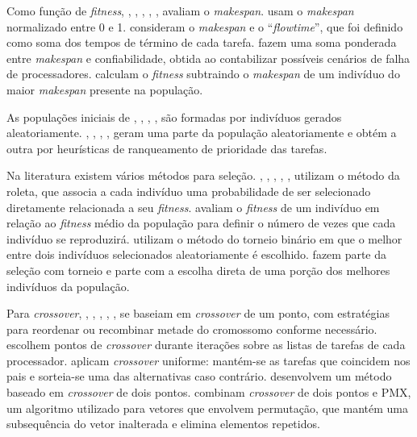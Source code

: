 \documentclass[fleqn,10pt]{SelfArx} %
\begin{document}
Como função de \textit{fitness}, \citeauthor{Hou1994}, \citeauthor{WANG19978}, \citeauthor{Correa}, \citeauthor{HWANG2008976}, \citeauthor{OMARA201013}, \citeauthor{Morady} avaliam o \textit{makespan}. \citeauthor{Kwok:1997:ESA:274066.274077} usam o \textit{makespan} normalizado entre 0 e 1. \citeauthor{Kaur_heuristicsbased} consideram o \textit{makespan} e o ``\textit{flowtime}'', que foi definido como soma dos tempos de término de cada tarefa. \citeauthor{CHITRA20112725} fazem uma soma ponderada entre \textit{makespan} e confiabilidade, obtida ao contabilizar possíveis cenários de falha de processadores. \citeauthor{XU2014255} calculam o \textit{fitness} subtraindo o \textit{makespan} de um indivíduo do maior \textit{makespan} presente na população.

As populações iniciais de \citeauthor{Hou1994}, \citeauthor{Correa}, \citeauthor{HWANG2008976}, \citeauthor{CHITRA20112725}, \citeauthor{Morady} são formadas por indivíduos gerados aleatoriamente. \citeauthor{WANG19978}, \citeauthor{Kwok:1997:ESA:274066.274077}, \citeauthor{Kaur_heuristicsbased}, \citeauthor{OMARA201013}, \citeauthor{XU2014255} geram uma parte da população aleatoriamente e obtém a outra por heurísticas de ranqueamento de prioridade das tarefas.

Na literatura existem vários métodos para seleção. \citeauthor{Hou1994}, \citeauthor{WANG19978}, \citeauthor{HWANG2008976}, \citeauthor{Kaur_heuristicsbased}, \citeauthor{CHITRA20112725}, \citeauthor{XU2014255} utilizam o método da roleta, que associa a cada indivíduo uma probabilidade de ser selecionado diretamente relacionada a seu \textit{fitness}. \citeauthor{Kwok:1997:ESA:274066.274077} avaliam o \textit{fitness} de um indivíduo em relação ao \textit{fitness} médio da população para definir o número de vezes que cada indivíduo se reproduzirá. \citeauthor{OMARA201013} utilizam o método do torneio binário em que o melhor entre dois indivíduos selecionados aleatoriamente é escolhido. \citeauthor{Morady} fazem parte da seleção com torneio e parte com a escolha direta de uma porção dos melhores indivíduos da população.

Para \textit{crossover}, \citeauthor{WANG19978}, \citeauthor{Kwok:1997:ESA:274066.274077}, \citeauthor{CHITRA20112725}, \citeauthor{Kaur_heuristicsbased}, \citeauthor{OMARA201013}, \citeauthor{XU2014255} se baseiam em \textit{crossover} de um ponto, com estratégias para reordenar ou recombinar metade do cromossomo conforme necessário. \citeauthor{Hou1994} escolhem pontos de \textit{crossover} durante iterações sobre as listas de tarefas de cada processador. \citeauthor{Correa} aplicam \textit{crossover} uniforme: mantém-se as tarefas que coincidem nos pais e sorteia-se uma das alternativas caso contrário. \citeauthor{HWANG2008976} desenvolvem um método baseado em \textit{crossover} de dois pontos. \citeauthor{Morady} combinam \textit{crossover} de dois pontos e PMX, um algoritmo utilizado para vetores que envolvem permutação, que mantém uma subsequência do vetor inalterada e elimina elementos repetidos.
\end{document}
